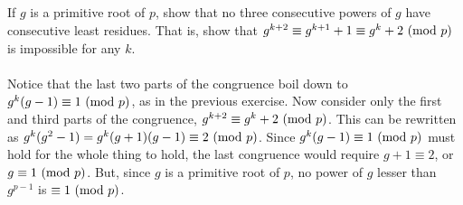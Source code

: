 \documentclass{article} \usepackage{amsmath}
\begin{document}
\subsection{}
If $g$ is a primitive root of $p$, show that no three consecutive powers of $g$
have consecutive least residues. That is, show that
$g^{k+2} \equiv g^{k+1} + 1 \equiv g^k + 2 \ (\mathrm{mod}\ p)$ is impossible for any $k$.\\~\\
Notice that the last two parts of the congruence boil down to
$g^k(g - 1) \equiv 1 \ (\mathrm{mod}\ p)$, as in the previous exercise.
Now consider only the first and third parts of the congruence,
$g^{k+2} \equiv g^k + 2 \ (\mathrm{mod}\ p)$.
This can be rewritten as $g^k(g^2 - 1) = g^k(g + 1)(g - 1) \equiv 2 \ (\mathrm{mod}\ p)$.
Since $g^k(g - 1) \equiv 1 \ (\mathrm{mod}\ p)$ must hold for the whole thing to hold,
the last congruence would require $g + 1 \equiv 2$, or $g \equiv 1 \ (\mathrm{mod}\ p)$.
But, since $g$ is a primitive root of $p$, no power of $g$ lesser than
$g^{p - 1}$ is $\equiv 1 \ (\mathrm{mod}\ p)$.

\end{document}
